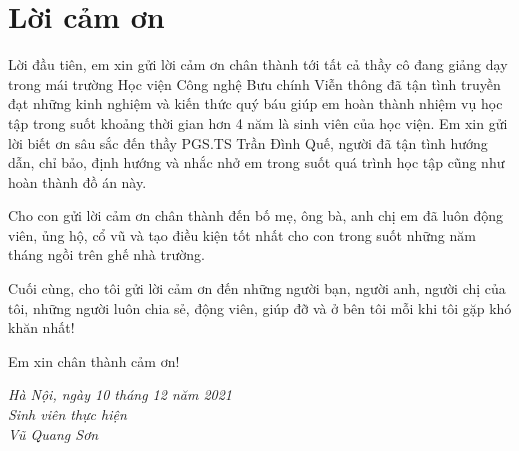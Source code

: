 \chapter*{\centering\Large{Lời cảm ơn}}

Lời đầu tiên, em xin gửi lời cảm ơn chân thành tới tất cả thầy cô đang giảng dạy
trong mái trường Học viện Công nghệ Bưu chính Viễn thông đã tận tình truyền đạt
những kinh nghiệm và kiến thức quý báu giúp em hoàn thành nhiệm vụ học tập trong
suốt khoảng thời gian hơn 4 năm là sinh viên của học viện. Em xin gửi lời biết ơn sâu
sắc đến thầy PGS.TS Trần Đình Quế, người đã tận tình hướng dẫn, chỉ bảo, định hướng
và nhắc nhở em trong suốt quá trình học tập cũng như hoàn thành đồ án này.


Cho con gửi lời cảm ơn chân thành đến bố mẹ, ông bà, anh chị em đã luôn động viên,
ủng hộ, cổ vũ và tạo điều kiện tốt nhất cho con trong suốt những năm tháng ngồi trên
ghế nhà trường.

Cuối cùng, cho tôi gửi lời cảm ơn đến những người bạn, người anh, người chị của
tôi, những người luôn chia sẻ, động viên, giúp đỡ và ở bên tôi mỗi khi tôi gặp khó khăn
nhất!

Em xin chân thành cảm ơn!

\begin{flushright}
\textit {Hà Nội, ngày 10 tháng 12 năm 2021} \\
\textit{Sinh viên thực hiện} \\
\textit {Vũ Quang Sơn}
\end{flushright}

